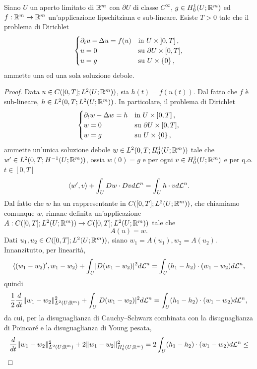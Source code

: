 \begin{teorema}
Siano $U$ un aperto limitato di $\mathbb{R}^m$ con $\partial U$ di classe $C^\infty$, $g \in H^1_0(U;\mathbb{R}^m)$ ed $f: \mathbb{R}^m \to \mathbb{R}^m$ un'applicazione lipschitziana e sub-lineare. Esiste $T>0$ tale che il problema di Dirichlet
\[ 	\begin{cases}
	\partial_t u-\Delta u = f(u) & \textup{in } U \times \left] 0,T\right],\\
	u = 0 & \textup{su } \partial U \times [0,T],\\
	u=g & \textup{su }  U \times \left\lbrace 0\right\rbrace ,
\end{cases} \]
ammette una ed una sola soluzione debole.
\end{teorema}
\begin{proof}
Data $u \in C([0,T];L^2(U;\mathbb{R}^m))$, sia $h(t) = f(u(t))$. Dal fatto che $f$ è sub-lineare, $h \in L^2(0,T;L^2(U;\mathbb{R}^m))$. In particolare, il problema di Dirichlet
\[ 	\begin{cases}
	\partial_t w-\Delta w = h & \textup{in } U \times \left] 0,T\right],\\
	w = 0 & \textup{su } \partial U \times [0,T],\\
	w=g & \textup{su }  U \times \left\lbrace 0\right\rbrace ,
\end{cases} \]
ammette un'unica soluzione debole $w \in L^2(0,T;H^1_0(U;\mathbb{R}^m))$ tale che $w' \in L^2(0,T;H^{-1}(U;\mathbb{R}^m))$, ossia $w(0) = g$ e per ogni $v \in H^1_0(U;\mathbb{R}^m)$ e per q.o. $t \in [0,T]$
\[ \braket{w',v} + \int_U Dw \cdot Dv d\mathcal{L}^n = \int_U h\cdot v d\mathcal{L}^n. \]
Dal fatto che $w$ ha un rappresentante in $C([0,T];L^2(U;\mathbb{R}^m))$, che chiamiamo comunque $w$, rimane definita un'applicazione $A: C([0,T];L^2(U;\mathbb{R}^m)) \to C([0,T];L^2(U;\mathbb{R}^m))$ tale che 
\[ A(u) = w. \]
Dati $u_1,u_2 \in C([0,T];L^2(U;\mathbb{R}^m))$, siano $w_1 = A(u_1), w_2 = A(u_2)$. Innanzitutto, per linearità,
\begin{align*}
\braket{(w_1-w_2)',w_1-w_2} + \int_U \lvert D(w_1-w_2)\rvert^2d\mathcal{L}^n = \int_U (h_1-h_2)\cdot (w_1-w_2) d\mathcal{L}^n,
\end{align*}
quindi 
\begin{align*}
	\frac{1}{2} \frac{d}{dt}\lVert w_1-w_2\rVert_{L^2(U;\mathbb{R}^m)}^2+ \int_U \lvert D(w_1-w_2)\rvert^2d\mathcal{L}^n = \int_U (h_1-h_2)\cdot (w_1-w_2) d\mathcal{L}^n,
\end{align*}
da cui, per la disuguaglianza di Cauchy--Schwarz combinata con la disuguaglianza di Poincaré e la disuguaglianza di Young pesata,
\begin{align*}
\frac{d}{dt}\norm{w_1-w_2}_{L^2(U;\R^m)}^2+ 2\norm{w_1 - w_2}_{H^1_0(U;\R^m)}^2 &= 2\int_U (h_1-h_2)\cdot (w_1-w_2) d\mathcal{L}^n \le \\

\end{align*}
\end{proof}
